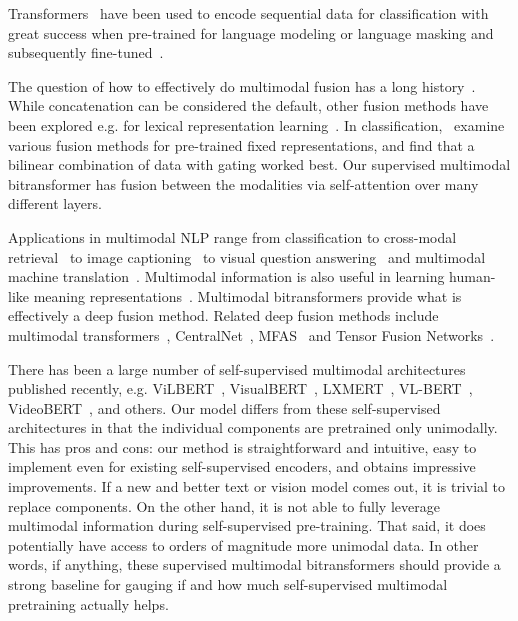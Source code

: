 \documentclass[11pt,a4paper]{article}
\begin{document}
Transformers~\cite{Vaswani:2017nips} have been used to encode sequential data for classification with great success when pre-trained for language modeling or language masking and subsequently fine-tuned~\cite{Radford:2018tr,Devlin:2019naacl}.

The question of how to effectively do multimodal fusion has a long history~\cite{Baltrusaitis:2019survey}. While concatenation can be considered the default, other fusion methods have been explored e.g. for lexical representation learning~\cite{Bruni:2014jair,Lazaridou:2015skipgram}. In classification,~ examine various fusion methods for pre-trained fixed representations, and find that a bilinear combination of data with gating worked best. Our supervised multimodal bitransformer has fusion between the modalities via self-attention over many different layers.

Applications in multimodal NLP range from classification to cross-modal retrieval~\cite{Weston:2011wsabie,Frome:2013devise,Socher:2013nips} to image captioning~\cite{Bernardi:2016captioning} to visual question answering~\cite{Antol2015vqa} and multimodal machine translation~\cite{Elliott:2017emnlp}. Multimodal information is also useful in learning human-like meaning representations~\cite{Baroni:16,Kiela:17thesis}. Multimodal bitransformers provide what is effectively a deep fusion method. Related deep fusion methods include multimodal transformers~\cite{Tsai:2019acl}, CentralNet~\cite{Vielzeuf:2018eccv}, MFAS~\cite{Perez-Rua:2019arxiv} and Tensor Fusion Networks~\cite{Zadeh2017tfn}.

There has been a large number of self-supervised multimodal architectures published recently, e.g. ViLBERT~\cite{Lu:2019vilbert}, VisualBERT~\cite{Li:2019visualbert}, LXMERT~\cite{Tan:2019lxmert}, VL-BERT~\cite{Su:2019vlbert}, VideoBERT~\cite{Sun:2019arxiv}, and others. Our model differs from these self-supervised architectures in that the individual components are pretrained only unimodally. This has pros and cons: our method is straightforward and intuitive, easy to implement even for existing self-supervised encoders, and obtains impressive improvements. If a new and better text or vision model comes out, it is trivial to replace components. On the other hand, it is not able to fully leverage multimodal information during self-supervised pre-training. That said, it does potentially have access to orders of magnitude more unimodal data. In other words, if anything, these supervised multimodal bitransformers should provide a strong baseline for gauging if and how much self-supervised multimodal pretraining actually helps.
\end{document}
